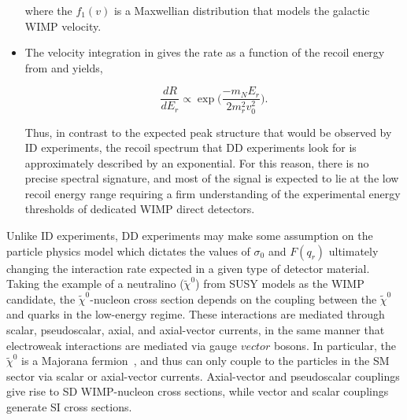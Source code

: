 \begin{itemize}
where the $f_1(v)$ is a Maxwellian distribution that models the galactic WIMP velocity. 

\item The velocity integration in  gives the rate as a function of the recoil energy from  and yields,

\begin{equation}
  \frac{dR}{dE_r} \propto \exp{\Big(\frac{-m_N E_r}{2m_r^2v_0^2}\Big)}.
\end{equation}

Thus, in contrast to the expected peak structure that would be observed by ID experiments, the recoil spectrum that DD experiments look for is approximately described by an exponential. For this reason, there is no precise spectral signature, and most of the signal is expected to lie at the low recoil energy range requiring a firm understanding of the experimental energy thresholds of dedicated WIMP direct detectors.
\end{itemize}

Unlike ID experiments, DD experiments may make some assumption on the particle physics model which dictates the values of $\sigma_0$ and $F(q_r)$ ultimately changing the interaction rate expected in a given type of detector material. Taking the example of a neutralino ($\tilde{\chi}^0$) from SUSY models as the WIMP candidate, the $\tilde{\chi}^0$-nucleon cross section depends on the coupling between the $\tilde{\chi}^0$ and quarks in the low-energy regime. These interactions are mediated through scalar, pseudoscalar, axial, and axial-vector currents, in the same manner that electroweak interactions are mediated via gauge $vector$ bosons. In particular, the $\tilde{\chi}^0$ is a Majorana fermion~\cite{Majorana2006}, and thus can only couple to the particles in the SM sector via scalar or axial-vector currents. Axial-vector and pseudoscalar couplings give rise to SD WIMP-nucleon cross sections, while vector and scalar couplings generate SI cross sections.


